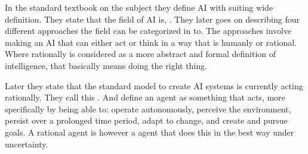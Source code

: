 \documentclass[12pt,A4]{report}
\theoremstyle{definition}
\begin{document}
In the standard textbook on the subject \autocite{Russel Norving} they define AI with suiting wide definition. They state that the field of AI is, . They later goes on describing four different approaches the field can be categorized in to. The approaches involve making an AI that can either act or think in a way that is humanly or rational. Where rationally is considered as a more abstract and formal definition of intelligence, that basically means doing the right thing. 

Later they state that the standard model to create AI systems is currently acting rationally. They call this . And define an agent as something that acts, more specifically by being able to: operate autonomously, perceive the environment, persist over a prolonged time period, adapt to change, and create and pursue goals. A rational agent is however a agent that does this in the best way under uncertainty\autocite{Russel Norving}. 



\end{document}
